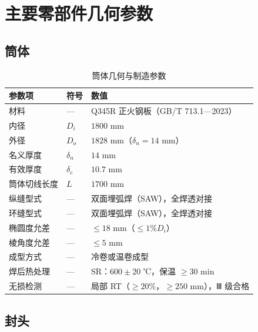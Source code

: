 \section{主要零部件几何参数}
\label{sec:cad-components}

\subsection{筒体}

\begin{table}[htbp]
  \centering
  \caption{筒体几何与制造参数}
  \label{tab:cad-cylinder}
  \small\renewcommand{\arraystretch}{1.15}
  \setlength{\tabcolsep}{10pt}
  \begin{tabularx}{\textwidth}{@{}l l l @{}}
    \toprule
    \textbf{参数项} & \textbf{符号} & \textbf{数值} \\
    \midrule
    材料                    & —        & Q345R 正火钢板（GB/T 713.1—2023） \\
    内径                    & $D_i$    & $1800$ mm \\
    外径                    & $D_o$    & $1828$ mm（$\delta_n = 14$ mm） \\
    名义厚度                & $\delta_n$ & $14$ mm \\
    有效厚度                & $\delta_e$ & $10.7$ mm \\
    筒体切线长度            & $L$      & $1700$ mm \\
    纵缝型式                & —        & 双面埋弧焊（SAW），全焊透对接 \\
    环缝型式                & —        & 双面埋弧焊（SAW），全焊透对接 \\
    椭圆度允差              & —        & $\le 18$ mm（$\le 1\% D_i$） \\
    棱角度允差              & —        & $\le 5$ mm \\
    成型方式                & —        & 冷卷或温卷成型 \\
    焊后热处理              & —        & SR：$600\pm20$ ℃，保温 $\ge 30$ min \\
    无损检测                & —        & 局部 RT（$\ge 20\%$，$\ge 250$ mm），Ⅲ 级合格 \\
    \bottomrule
  \end{tabularx}
\end{table}

\subsection{封头}


